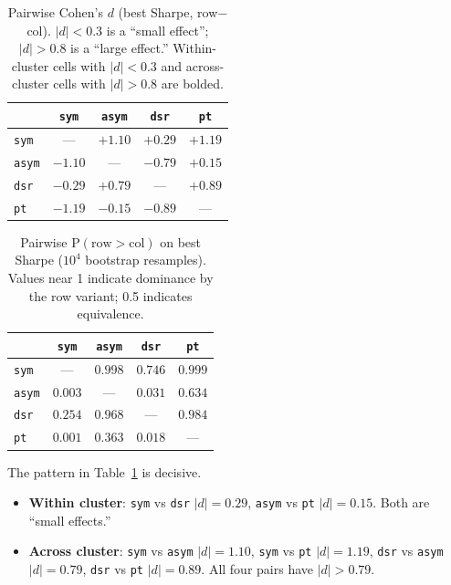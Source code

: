 \documentclass[11pt, a4paper]{article}
\begin{document}
\begin{table}[!htbp]
\centering
\caption{Pairwise Cohen's $d$ (best Sharpe, row$-$col). $|d|<0.3$ is a
``small effect''; $|d|>0.8$ is a ``large effect.'' Within-cluster cells with
$|d|<0.3$ and across-cluster cells with $|d|>0.8$ are bolded.}
\begin{tabular}{lcccc}
\toprule
 & \texttt{sym} & \texttt{asym} & \texttt{dsr} & \texttt{pt} \\
\midrule
\texttt{sym}  & ---   & $+\mathbf{1.10}$ & $+0.29$ & $+\mathbf{1.19}$ \\
\texttt{asym} & $-\mathbf{1.10}$ & ---   & $-0.79$ & $+0.15$ \\
\texttt{dsr}  & $-0.29$ & $+0.79$ & ---   & $+\mathbf{0.89}$ \\
\texttt{pt}   & $-\mathbf{1.19}$ & $-0.15$ & $-\mathbf{0.89}$ & ---   \\
\bottomrule
\end{tabular}
\label{tab:pareto_cohens_d}
\end{table}

\begin{table}[!htbp]
\centering
\caption{Pairwise $\mathrm{P}(\text{row} > \text{col})$ on best Sharpe
($10^4$ bootstrap resamples). Values near 1 indicate dominance by the row
variant; 0.5 indicates equivalence.}
\begin{tabular}{lcccc}
\toprule
 & \texttt{sym} & \texttt{asym} & \texttt{dsr} & \texttt{pt} \\
\midrule
\texttt{sym}  & ---   & $0.998$ & $0.746$ & $0.999$ \\
\texttt{asym} & $0.003$ & ---   & $0.031$ & $0.634$ \\
\texttt{dsr}  & $0.254$ & $0.968$ & ---   & $0.984$ \\
\texttt{pt}   & $0.001$ & $0.363$ & $0.018$ & ---   \\
\bottomrule
\end{tabular}
\label{tab:pareto_p_a_gt_b}
\end{table}

The pattern in Table~\ref{tab:pareto_cohens_d} is decisive.
\begin{itemize}[leftmargin=*]
\item \textbf{Within cluster}: \texttt{sym} vs \texttt{dsr} $|d| = 0.29$,
\texttt{asym} vs \texttt{pt} $|d| = 0.15$. Both are ``small effects.''
\item \textbf{Across cluster}: \texttt{sym} vs \texttt{asym} $|d| = 1.10$,
\texttt{sym} vs \texttt{pt} $|d| = 1.19$, \texttt{dsr} vs \texttt{asym}
$|d| = 0.79$, \texttt{dsr} vs \texttt{pt} $|d| = 0.89$. All four pairs have
$|d| > 0.79$.
\end{itemize}
\end{document}

